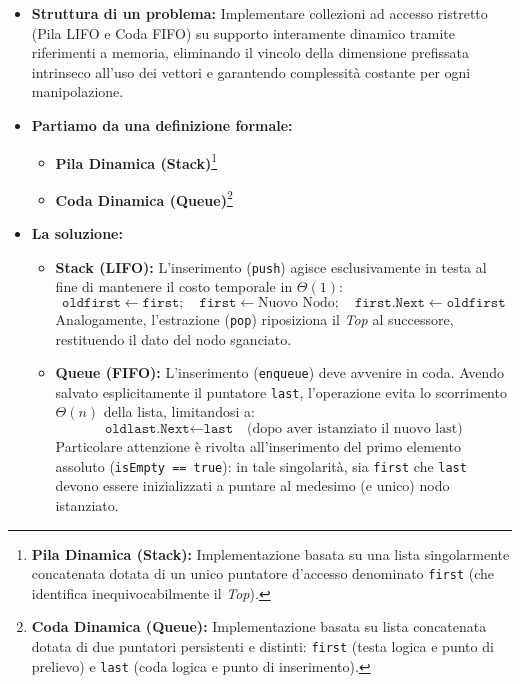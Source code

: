 \documentclass[a4paper, 11pt]{report}
\newcommand{\definizione}[2]{%
\textbf{#1}\footnote{\textbf{#1:} #2}%
}
\begin{document}
\begin{itemize}
    \item \textbf{Struttura di un problema:}
    Implementare collezioni ad accesso ristretto (Pila LIFO e Coda FIFO) su supporto interamente dinamico tramite riferimenti a memoria, eliminando il vincolo della dimensione prefissata intrinseco all'uso dei vettori e garantendo complessità costante per ogni manipolazione.

    \item \textbf{Partiamo da una definizione formale:}
    \begin{itemize}
        \item \definizione{Pila Dinamica (Stack)}{Implementazione basata su una lista singolarmente concatenata dotata di un unico puntatore d'accesso denominato \texttt{first} (che identifica inequivocabilmente il \textit{Top}).}
        \item \definizione{Coda Dinamica (Queue)}{Implementazione basata su lista concatenata dotata di due puntatori persistenti e distinti: \texttt{first} (testa logica e punto di prelievo) e \texttt{last} (coda logica e punto di inserimento).}
    \end{itemize}

    \item \textbf{La soluzione:}
    \begin{itemize}
        \item \textbf{Stack (LIFO):}
        L'inserimento (\texttt{push}) agisce esclusivamente in testa al fine di mantenere il costo temporale in $\Theta(1)$:
        \begin{equation*}
        \texttt{oldfirst} \gets \texttt{first}; \quad \texttt{first} \gets \text{Nuovo Nodo}; \quad \texttt{first.Next} \gets \texttt{oldfirst}
        \end{equation*}
        Analogamente, l'estrazione (\texttt{pop}) riposiziona il \textit{Top} al successore, restituendo il dato del nodo sganciato.
        \item \textbf{Queue (FIFO):}
        L'inserimento (\texttt{enqueue}) deve avvenire in coda. Avendo salvato esplicitamente il puntatore \texttt{last}, l'operazione evita lo scorrimento $\Theta(n)$ della lista, limitandosi a:
        \begin{equation*}
        \texttt{oldlast.Next} \gets \texttt{last} \quad \text{(dopo aver istanziato il nuovo last)}
        \end{equation*}
        Particolare attenzione è rivolta all'inserimento del primo elemento assoluto (\texttt{isEmpty == true}): in tale singolarità, sia \texttt{first} che \texttt{last} devono essere inizializzati a puntare al medesimo (e unico) nodo istanziato.
    \end{itemize}
\end{itemize}
\end{document}
